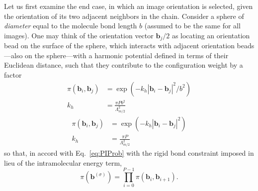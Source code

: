 Let us first examine the end case, in which an image orientation is selected, given the orientation of its two adjacent neighbors in the chain. Consider a sphere of \emph{diameter} equal to the molecule bond length $b$ (assumed to be the same for all images). One may think of the orientation vector ${\mathbf b}_j/2$ as locating an orientation bead on the surface of the sphere, which interacts with adjacent orientation beads---also on the sphere---with a harmonic potential defined in terms of their Euclidean distance, such that they contribute to the configuration weight by a factor
\ifkhExplicitP
\begin{equation}
\begin{aligned}
\label{eq:piRigid}
\pi({\mathbf b}_i,{\mathbf b}_j) &= \exp\left(-k_h |{\mathbf b}_i - {\mathbf b}_j|^2/b^2\right)\\
k_h &=\frac{\pi P b^2}{\Lambda^2_{m/2}}\nonumber
\end{aligned}
\end{equation}
\else
\begin{equation}
\begin{aligned}
\label{eq:piRigid}
\pi({\mathbf b}_i,{\mathbf b}_j) &= \exp\left(-k_h |{\mathbf b}_i - {\mathbf b}_j|^2\right)\\
k_h &=\frac{\pi P}{\Lambda^2_{m/2}}\nonumber
\end{aligned}
\end{equation}
\fi
so that, in accord with Eq.~\ref{eq:PIProb} with the rigid bond constraint imposed in lieu of the intramolecular energy term,
\begin{equation}
\label{eq:piTotal}
\pi({\mathbf b}^{(\sigma)}) = \prod_{i=0}^{P-1}\pi({\mathbf b}_i,{\mathbf b}_{i+1}).
\end{equation}

